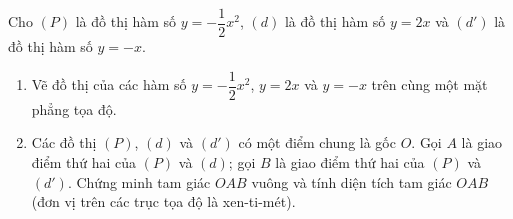 \begin{ex}%
	Cho $(P)$ là đồ thị hàm số $y=-\dfrac{1}{2}x^2$, $(d)$ là đồ thị hàm số $y=2x$ và $(d')$ là đồ thị hàm số $y=-x$.
	\begin{enumerate}
	\item Vẽ đồ thị của các hàm số $y=-\dfrac{1}{2}x^2$, $y=2x$ và $y=-x$ trên cùng một mặt phẳng tọa độ.
	\item Các đồ thị $(P)$, $(d)$ và $(d')$ có một điểm chung là gốc $O$. Gọi $A$ là giao điểm thứ hai của $(P)$ và $(d)$; gọi $B$ là giao điểm thứ hai của $(P)$ và $(d')$. Chứng minh tam giác $OAB$ vuông và tính diện tích tam giác $OAB$ (đơn vị trên các trục tọa độ là xen-ti-mét).
        \end{enumerate}
\end{ex}
